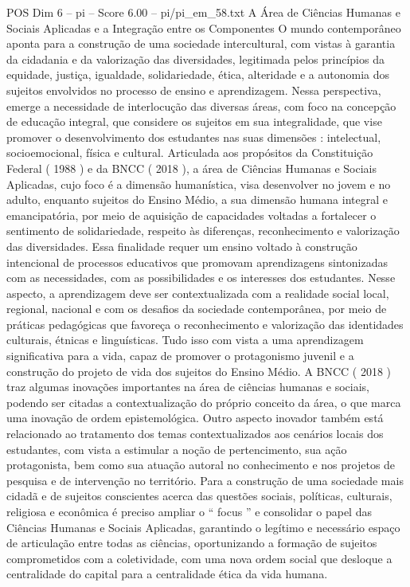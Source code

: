 \begin{textsample}{POS Dim 6 – pi – Score 6.00 – pi/pi\_em\_58.txt}  \label{ex:f6_pos_200}
A Área de Ciências Humanas e Sociais Aplicadas e a Integração entre os Componentes O mundo contemporâneo aponta para a construção de uma sociedade intercultural, com vistas à garantia da cidadania e da valorização das diversidades, legitimada pelos princípios da equidade, justiça, igualdade, solidariedade, ética, alteridade e a autonomia dos sujeitos envolvidos no processo de ensino e aprendizagem.
Nessa perspectiva, emerge a necessidade de interlocução das diversas áreas, com foco na concepção de educação integral, que considere os sujeitos em sua integralidade, que vise promover o desenvolvimento dos estudantes nas suas dimensões : intelectual, socioemocional, física e cultural.
Articulada aos propósitos da Constituição Federal ( 1988 ) e da BNCC ( 2018 ), a área de Ciências Humanas e Sociais Aplicadas, cujo foco é a dimensão humanística, visa desenvolver no jovem e no adulto, enquanto sujeitos do Ensino Médio, a sua dimensão humana integral e emancipatória, por meio de aquisição de capacidades voltadas a fortalecer o sentimento de solidariedade, respeito às diferenças, reconhecimento e valorização das diversidades.
Essa finalidade requer um ensino voltado à construção intencional de processos educativos que promovam aprendizagens sintonizadas com as necessidades, com as possibilidades e os interesses dos estudantes.
Nesse aspecto, a aprendizagem deve ser contextualizada com a realidade social local, regional, nacional e com os desafios da sociedade contemporânea, por meio de práticas pedagógicas que favoreça o reconhecimento e valorização das identidades culturais, étnicas e linguísticas.
Tudo isso com vista a uma aprendizagem significativa para a vida, capaz de promover o protagonismo juvenil e a construção do projeto de vida dos sujeitos do Ensino Médio.
A BNCC ( 2018 ) traz algumas inovações importantes na área de ciências humanas e sociais, podendo ser citadas a contextualização do próprio conceito da área, o que marca uma inovação de ordem epistemológica.
Outro aspecto inovador também está relacionado ao tratamento dos temas contextualizados aos cenários locais dos estudantes, com vista a estimular a noção de pertencimento, sua ação protagonista, bem como sua atuação autoral no conhecimento e nos projetos de pesquisa e de intervenção no território.
Para a construção de uma sociedade mais cidadã e de sujeitos conscientes acerca das questões sociais, políticas, culturais, religiosa e econômica é preciso ampliar o “ focus ” e consolidar o papel das Ciências Humanas e Sociais Aplicadas, garantindo o legítimo e necessário espaço de articulação entre todas as ciências, oportunizando a formação de sujeitos comprometidos com a coletividade, com uma nova ordem social que desloque a centralidade do capital para a centralidade ética da vida humana.

\end{textsample}
